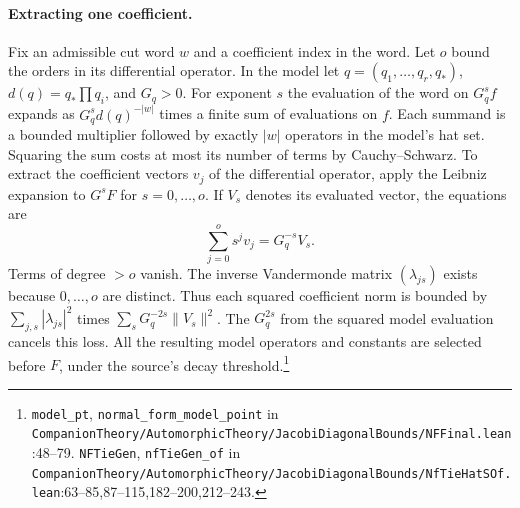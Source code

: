 \paragraph{Extracting one coefficient.}
Fix an admissible cut word $w$ and a coefficient index in the word. Let $o$ bound the orders in its differential operator. In the model let $q=(q_1,\ldots,q_r,q_*)$, $d(q)=q_*\prod q_i$, and $G_q>0$. For exponent $s$ the evaluation of the word on $G_q^s f$ expands as $G_q^s d(q)^{-|w|}$ times a finite sum of evaluations on $f$. Each summand is a bounded multiplier followed by exactly $|w|$ operators in the model's hat set. Squaring the sum costs at most its number of terms by Cauchy--Schwarz. To extract the coefficient vectors $v_j$ of the differential operator, apply the Leibniz expansion to $G^s F$ for $s=0,\ldots,o$. If $V_s$ denotes its evaluated vector, the equations are
\[
 \sum_{j=0}^{o}s^j v_j=G_q^{-s}V_s .
\]
Terms of degree $>o$ vanish. The inverse Vandermonde matrix $(\lambda_{js})$ exists because $0,\ldots,o$ are distinct. Thus each squared coefficient norm is bounded by $\sum_{j,s}|\lambda_{js}|^2$ times $\sum_sG_q^{-2s}\|V_s\|^2$. The $G_q^{2s}$ from the squared model evaluation cancels this loss. All the resulting model operators and constants are selected before $F$, under the source's decay threshold.\footnote{\nolinkurl{model_pt}, \nolinkurl{normal_form_model_point} in \nolinkurl{CompanionTheory/AutomorphicTheory/JacobiDiagonalBounds/NFFinal.lean}\allowbreak:48--79. \nolinkurl{NFTieGen}, \nolinkurl{nfTieGen_of} in \nolinkurl{CompanionTheory/AutomorphicTheory/JacobiDiagonalBounds/NfTieHatSOf.lean}\allowbreak:63--85,87--115,182--200,212--243.}

